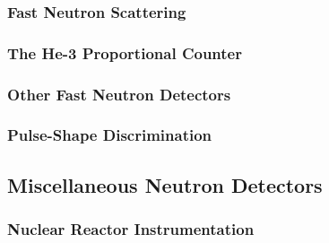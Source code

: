 \subsubsection{Fast Neutron Scattering}


\subsubsection{The He-3 Proportional Counter}


\subsubsection{Other Fast Neutron Detectors}


\subsubsection{Pulse-Shape Discrimination}


\subsection{Miscellaneous Neutron Detectors}
\subsubsection{Nuclear Reactor Instrumentation}
